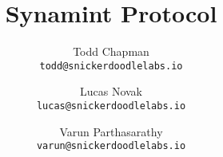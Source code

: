\documentclass{article}
\title{Synamint Protocol}
\author{
  Todd Chapman\\
  \texttt{todd@snickerdoodlelabs.io}
  \and
  Lucas Novak\\
  \texttt{lucas@snickerdoodlelabs.io}
  \and
  Varun Parthasarathy\\
  \texttt{varun@snickerdoodlelabs.io}
}
\begin{document}
\maketitle
\tableofcontents{}
\pagebreak















\end{document}
